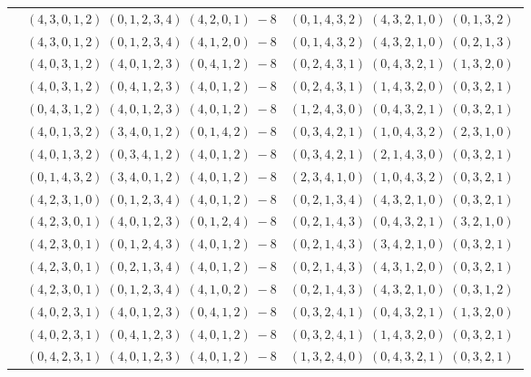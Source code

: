 \documentclass[11pt]{article}
\begin{document}
\begin{longtable}[l]{|c|c|c|}
 \cline{2-3} 
 & $(4 ,3 ,0 ,1 ,2) \;(0 ,1 ,2 ,3 ,4) \;(4 ,2 ,0 ,1) \;-8$ & $(0 ,1 ,4 ,3 ,2) \;(4 ,3 ,2 ,1 ,0) \;(0 ,1 ,3 ,2) \;$\\ 
 \cline{2-3} 
 & $(4 ,3 ,0 ,1 ,2) \;(0 ,1 ,2 ,3 ,4) \;(4 ,1 ,2 ,0) \;-8$ & $(0 ,1 ,4 ,3 ,2) \;(4 ,3 ,2 ,1 ,0) \;(0 ,2 ,1 ,3) \;$\\ 
 \cline{2-3} 
 & $(4 ,0 ,3 ,1 ,2) \;(4 ,0 ,1 ,2 ,3) \;(0 ,4 ,1 ,2) \;-8$ & $(0 ,2 ,4 ,3 ,1) \;(0 ,4 ,3 ,2 ,1) \;(1 ,3 ,2 ,0) \;$\\ 
 \cline{2-3} 
 & $(4 ,0 ,3 ,1 ,2) \;(0 ,4 ,1 ,2 ,3) \;(4 ,0 ,1 ,2) \;-8$ & $(0 ,2 ,4 ,3 ,1) \;(1 ,4 ,3 ,2 ,0) \;(0 ,3 ,2 ,1) \;$\\ 
 \cline{2-3} 
 & $(0 ,4 ,3 ,1 ,2) \;(4 ,0 ,1 ,2 ,3) \;(4 ,0 ,1 ,2) \;-8$ & $(1 ,2 ,4 ,3 ,0) \;(0 ,4 ,3 ,2 ,1) \;(0 ,3 ,2 ,1) \;$\\ 
 \cline{2-3} 
 & $(4 ,0 ,1 ,3 ,2) \;(3 ,4 ,0 ,1 ,2) \;(0 ,1 ,4 ,2) \;-8$ & $(0 ,3 ,4 ,2 ,1) \;(1 ,0 ,4 ,3 ,2) \;(2 ,3 ,1 ,0) \;$\\ 
 \cline{2-3} 
 & $(4 ,0 ,1 ,3 ,2) \;(0 ,3 ,4 ,1 ,2) \;(4 ,0 ,1 ,2) \;-8$ & $(0 ,3 ,4 ,2 ,1) \;(2 ,1 ,4 ,3 ,0) \;(0 ,3 ,2 ,1) \;$\\ 
 \cline{2-3} 
 & $(0 ,1 ,4 ,3 ,2) \;(3 ,4 ,0 ,1 ,2) \;(4 ,0 ,1 ,2) \;-8$ & $(2 ,3 ,4 ,1 ,0) \;(1 ,0 ,4 ,3 ,2) \;(0 ,3 ,2 ,1) \;$\\ 
 \cline{2-3} 
 & $(4 ,2 ,3 ,1 ,0) \;(0 ,1 ,2 ,3 ,4) \;(4 ,0 ,1 ,2) \;-8$ & $(0 ,2 ,1 ,3 ,4) \;(4 ,3 ,2 ,1 ,0) \;(0 ,3 ,2 ,1) \;$\\ 
 \cline{2-3} 
 & $(4 ,2 ,3 ,0 ,1) \;(4 ,0 ,1 ,2 ,3) \;(0 ,1 ,2 ,4) \;-8$ & $(0 ,2 ,1 ,4 ,3) \;(0 ,4 ,3 ,2 ,1) \;(3 ,2 ,1 ,0) \;$\\ 
 \cline{2-3} 
 & $(4 ,2 ,3 ,0 ,1) \;(0 ,1 ,2 ,4 ,3) \;(4 ,0 ,1 ,2) \;-8$ & $(0 ,2 ,1 ,4 ,3) \;(3 ,4 ,2 ,1 ,0) \;(0 ,3 ,2 ,1) \;$\\ 
 \cline{2-3} 
 & $(4 ,2 ,3 ,0 ,1) \;(0 ,2 ,1 ,3 ,4) \;(4 ,0 ,1 ,2) \;-8$ & $(0 ,2 ,1 ,4 ,3) \;(4 ,3 ,1 ,2 ,0) \;(0 ,3 ,2 ,1) \;$\\ 
 \cline{2-3} 
 & $(4 ,2 ,3 ,0 ,1) \;(0 ,1 ,2 ,3 ,4) \;(4 ,1 ,0 ,2) \;-8$ & $(0 ,2 ,1 ,4 ,3) \;(4 ,3 ,2 ,1 ,0) \;(0 ,3 ,1 ,2) \;$\\ 
 \cline{2-3} 
 & $(4 ,0 ,2 ,3 ,1) \;(4 ,0 ,1 ,2 ,3) \;(0 ,4 ,1 ,2) \;-8$ & $(0 ,3 ,2 ,4 ,1) \;(0 ,4 ,3 ,2 ,1) \;(1 ,3 ,2 ,0) \;$\\ 
 \cline{2-3} 
 & $(4 ,0 ,2 ,3 ,1) \;(0 ,4 ,1 ,2 ,3) \;(4 ,0 ,1 ,2) \;-8$ & $(0 ,3 ,2 ,4 ,1) \;(1 ,4 ,3 ,2 ,0) \;(0 ,3 ,2 ,1) \;$\\ 
 \cline{2-3} 
 & $(0 ,4 ,2 ,3 ,1) \;(4 ,0 ,1 ,2 ,3) \;(4 ,0 ,1 ,2) \;-8$ & $(1 ,3 ,2 ,4 ,0) \;(0 ,4 ,3 ,2 ,1) \;(0 ,3 ,2 ,1) \;$\\ 

\end{longtable}
\end{document}
